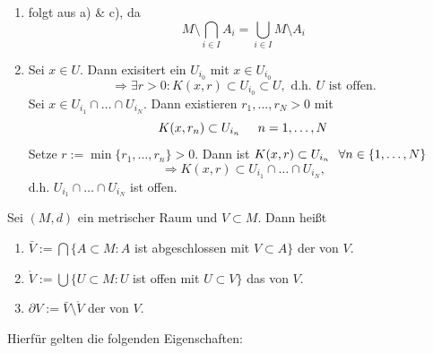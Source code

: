 \begin{prop}
\begin{beweis}
\begin{enumerate}[label=\alph*\upshape)]
			\item folgt aus a) \& c), da
				\[ M \setminus \bigcap_{i \in I} A_{i} = \bigcup_{i \in I} M \setminus A_{i} \]
			\item Sei $x \in U$. Dann exisitert ein $U_{i_{0}}$ mit $x \in U_{i_{0}}$
			\[ \Rightarrow \exists r > 0: K(x, r) \subset U_{i_{0}} \subset U, \text{ d.h. } U \text{ ist offen.}  \]
			Sei $x \in U_{i_{1}} \cap \dotsc \cap U_{i_{N}}.$ Dann existieren $r_{1}, \dotsc, r_{N} > 0$ mit
			\[ K(x, r_{n}) \subset U_{i_{n}} \hspace{0.5cm} n = 1, \dotsc, N \]
			Setze $r := \min \{ r_{1}, \dotsc, r_{n} \} > 0$. Dann ist $K(x, r) \subset U_{i_{n}} \hspace{0.25cm} \forall n \in \{ 1, \dotsc, N \}$
			\[ \Rightarrow K(x, r) \subset U_{i_{1}} \cap \dotsc \cap U_{i_{N}}, \]
			d.h. $U_{i_{1}} \cap \dotsc \cap U_{i_{N}}$ ist offen.
		\end{enumerate}	
	\end{beweis}
\end{prop}

\begin{definition} \label{def:1-4.7-abschinnrand}
	Sei $(M, d)$ ein metrischer Raum und $V \subset M$. Dann hei{\ss}t 
	\begin{enumerate}[label=\alph*\upshape)]
		\item $\bar V := \bigcap \{ A \subset M: A$ ist abgeschlossen mit $V \subset A \} $ der  von $V$.
		\item $\mathring V := \bigcup \{ U \subset M: U$ ist offen mit $U \subset V \}$ das  von $V$. 
		\item $ \partial V := \bar V \setminus \mathring V$ der  von $V$.
	\end{enumerate}
\end{definition}

Hierfür gelten die folgenden Eigenschaften:

